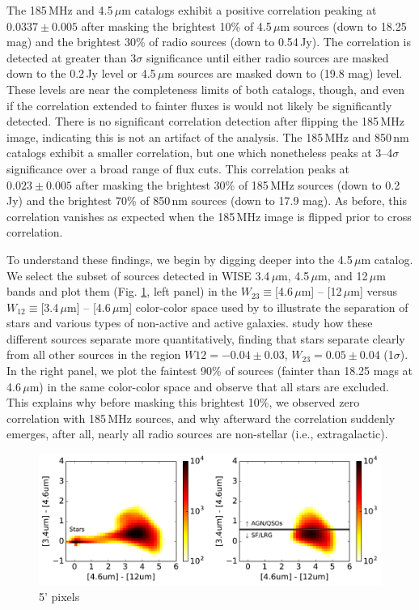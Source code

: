 \documentclass{emulateapj}
\begin{document}
The 185\,MHz and 4.5\,$\mu$m catalogs exhibit a positive correlation peaking at $0.0337\pm0.005$ after masking the brightest 10\% of 4.5\,$\mu$m sources (down to 18.25 mag) and the brightest 30\% of radio sources (down to 0.54\,Jy). The correlation is detected at greater than $3\sigma$ significance until either radio sources are masked down to the 0.2\,Jy level or 4.5\,$\mu$m sources are masked down to (19.8 mag) level. These levels are near the completeness limits of both catalogs, though, and even if the correlation extended to fainter fluxes is would not likely be significantly detected. There is no significant correlation detection after flipping the 185\,MHz image, indicating this is not an artifact of the analysis. The 185\,MHz and 850\,nm catalogs exhibit a smaller correlation, but one which nonetheless peaks at 3--4$\sigma$ significance over a broad range of flux cuts. This correlation peaks at $0.023\pm0.005$ after masking the brightest 30\% of 185\,MHz sources (down to 0.2\,Jy) and the brightest 70\% of 850\,nm sources (down to 17.9 mag). As before, this correlation vanishes as expected when the 185\,MHz image is flipped prior to cross correlation.

To understand these findings, we begin by digging deeper into the 4.5\,$\mu$m catalog. We select the subset of sources detected in WISE 3.4\,$\mu$m, 4.5\,$\mu$m, and 12\,$\mu$m bands and plot them (Fig. \ref{fig:wisecolorcolor}, left panel) in the $W_{23}\equiv$[4.6\,$\mu$m] -- [12\,$\mu$m] versus $W_{12}\equiv$[3.4\,$\mu$m] -- [4.6\,$\mu$m] color-color space used by \citet{Wright2010} to illustrate the separation of stars and various types of non-active and active galaxies. \citet{nikutta14} study how these different sources separate more quantitatively, finding that stars separate clearly from all other sources in the region $W{12}=-0.04\pm0.03$, $W_{23}=0.05\pm0.04$ (1$\sigma$). In the right panel, we plot the faintest 90\% of sources (fainter than 18.25 mags at 4.6\,$\mu$m) in the same color-color space and observe that all stars are excluded. This explains why before masking this brightest 10\%, we observed zero correlation with 185\,MHz sources, and why afterward the correlation suddenly emerges, after all, nearly all radio sources are non-stellar (i.e., extragalactic). 

\begin{figure}[h]
\centering
\includegraphics[width=6in]{images/wise_color_color_figure.pdf}
\caption{5' pixels}
\label{fig:wisecolorcolor}
\end{figure}
\end{document}
